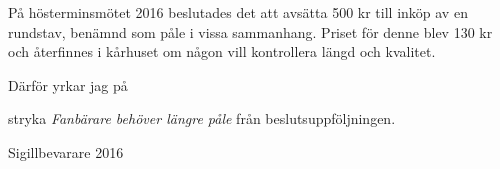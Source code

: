 \documentclass[../_main/handlingar.tex]{subfiles}
\begin{document}

På hösterminsmötet 2016 beslutades det att avsätta 500 kr till inköp av en rundstav, benämnd som påle i vissa sammanhang. Priset för denne blev 130 kr och återfinnes i kårhuset om någon vill kontrollera längd och kvalitet.

Därför yrkar jag på
\begin{attsatser}
    \att stryka \emph{Fanbärare behöver längre påle} från beslutsuppföljningen.
\end{attsatser}

\begin{signatures}{1}
    \mvh
	\signature{Emil Harvig}{Sigillbevarare 2016}
\end{signatures}
\end{document}
